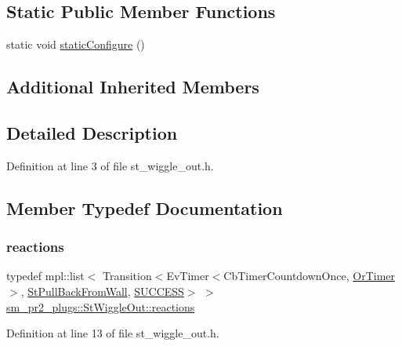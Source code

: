 \subsection*{Static Public Member Functions}
\begin{DoxyCompactItemize}
\item 
static void \hyperlink{structsm__pr2__plugs_1_1StWiggleOut_ad4db8d9b75e1fd0fb6641666d0b10554}{static\+Configure} ()
\end{DoxyCompactItemize}
\subsection*{Additional Inherited Members}


\subsection{Detailed Description}


Definition at line 3 of file st\+\_\+wiggle\+\_\+out.\+h.



\subsection{Member Typedef Documentation}
\mbox{\label{structsm__pr2__plugs_1_1StWiggleOut_a7984b3c4a0d48be520994c08bb97d328}} 
\subsubsection{\texorpdfstring{reactions}{reactions}}
{\footnotesize\ttfamily typedef mpl\+::list$<$ Transition$<$Ev\+Timer$<$Cb\+Timer\+Countdown\+Once, \hyperlink{classsm__pr2__plugs_1_1OrTimer}{Or\+Timer}$>$, \hyperlink{structsm__pr2__plugs_1_1StPullBackFromWall}{St\+Pull\+Back\+From\+Wall}, \hyperlink{classSUCCESS}{S\+U\+C\+C\+E\+SS}$>$ $>$ \hyperlink{structsm__pr2__plugs_1_1StWiggleOut_a7984b3c4a0d48be520994c08bb97d328}{sm\+\_\+pr2\+\_\+plugs\+::\+St\+Wiggle\+Out\+::reactions}}



Definition at line 13 of file st\+\_\+wiggle\+\_\+out.\+h.



